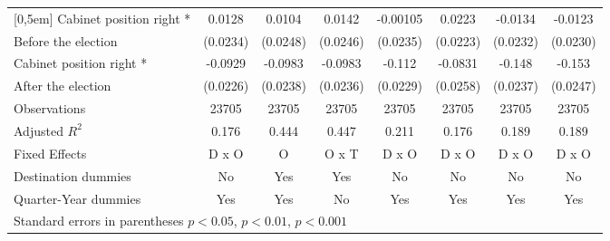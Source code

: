\begin{table}[htbp]
\begin{tabular}{l*{7}{c}}
[0,5em]
Cabinet position right * &      0.0128         &      0.0104         &      0.0142         &    -0.00105         &      0.0223         &     -0.0134         &     -0.0123         \\
Before the election                    &    (0.0234)         &    (0.0248)         &    (0.0246)         &    (0.0235)         &    (0.0223)         &    (0.0232)         &    (0.0230)         \\
[0,5em]
Cabinet position right * &     -0.0929\sym{***}&     -0.0983\sym{***}&     -0.0983\sym{***}&      -0.112\sym{***}&     -0.0831\sym{**} &      -0.148\sym{***}&      -0.153\sym{***}\\
After the election                    &    (0.0226)         &    (0.0238)         &    (0.0236)         &    (0.0229)         &    (0.0258)         &    (0.0237)         &    (0.0247)         \\
\hline
Observations        &       23705         &       23705         &       23705         &       23705         &       23705         &       23705         &       23705         \\
Adjusted \(R^{2}\)  &       0.176         &       0.444         &       0.447         &       0.211         &       0.176         &       0.189         &       0.189         \\
Fixed Effects       &       D x O         &           O         &       O x T         &       D x O         &       D x O         &       D x O         &       D x O         \\
Destination dummies &          No         &         Yes         &         Yes         &          No         &          No         &          No         &          No         \\
Quarter-Year dummies&         Yes         &         Yes         &          No         &         Yes         &         Yes         &         Yes         &         Yes         \\
\hline\hline
\multicolumn{8}{l}{ Standard errors in parentheses \sym{*} \(p<0.05\), \sym{**} \(p<0.01\), \sym{***} \(p<0.001\)}\\
\end{tabular}
\label{app_table_base-R6}
\end{table}
